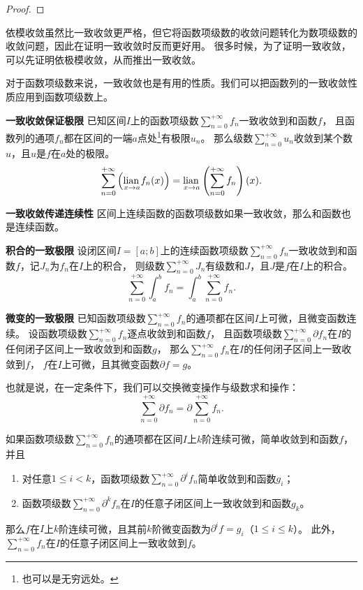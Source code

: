 \documentclass[12pt,UTF8]{ctexbook}
\begin{document}
\begin{appendix}
\begin{proof}
\end{proof}

依模收敛虽然比一致收敛更严格，但它将函数项级数的收敛问题转化为数项级数的收敛问题，因此在证明一致收敛时反而更好用。
很多时候，为了证明一致收敛，可以先证明依极模收敛，从而推出一致收敛。

对于函数项级数来说，一致收敛也是有用的性质。我们可以把函数列的一致收敛性质应用到函数项级数上。

\begin{tm}{\textbf{一致收敛保证极限}}
    已知区间$I$上的函数项级数$\sum_{n=0}^{+\infty} f_n$一致收敛到和函数$f$，
    且函数列的通项$f_n$都在区间的一端$a$点处\footnote{也可以是无穷远处。}有极限$u_n$。
    那么级数$\sum_{n=0}^{+\infty} u_n$收敛到某个数$u$，且$u$是$f$在$a$处的极限。
    $$ \sum_{n=0}^{+\infty} \left(\underset{x\to a}{\operatorname{lian}\,} f_n(x) \right) = \underset{x\to a}{\operatorname{lian}\,} \left(\sum_{n=0}^{+\infty} f_n\right)(x). $$
\end{tm}

\begin{tm}{\textbf{一致收敛传递连续性}}
    区间上连续函数的函数项级数如果一致收敛，那么和函数也是连续函数。
\end{tm}

\begin{tm}{\textbf{积合的一致极限}}
    设闭区间$I=[a;b]$上的连续函数项级数$\sum_{n=0}^{+\infty} f_n$一致收敛到和函数$f$，记$J_n$为$f_n$在$I$上的积合，
    则级数$\sum_{n=0}^{+\infty} J_n$有级数和$J$，且$J$是$f$在$I$上的积合。
    $$ \sum_{n=0}^{+\infty} \int_a^b f_n = \int_a^b \sum_{n=0}^{+\infty} f_n. $$
\end{tm}

\begin{tm}{\textbf{微变的一致极限}}
    已知函数项级数$\sum_{n=0}^{+\infty} f_n$的通项都在区间$I$上可微，且微变函数连续。
    设函数项级数$\sum_{n=0}^{+\infty} f_n$逐点收敛到和函数$f$，
    且函数项级数$\sum_{n=0}^{+\infty} \partial f_n$在$I$的任何闭子区间上一致收敛到和函数$g$，
    那么$\sum_{n=0}^{+\infty} f_n$在$I$的任何闭子区间上一致收敛到$f$，
    $f$在$I$上可微，且其微变函数$\partial f = g$。

    也就是说，在一定条件下，我们可以交换微变操作与级数求和操作：
    $$ \sum_{n=0}^{+\infty} \partial f_n = \partial \sum_{n=0}^{+\infty} f_n. $$
    
    如果函数项级数$\sum_{n=0}^{+\infty} f_n$的通项都在区间$I$上$k$阶连续可微，简单收敛到和函数$f$，并且
    \begin{enumerate}
        \item 对任意$1 \leqslant i < k$，函数项级数$\sum_{n=0}^{+\infty} \partial^i f_n$简单收敛到和函数$g_i$；
        \item 函数项级数$\sum_{n=0}^{+\infty} \partial^k f_n$在$I$的任意子闭区间上一致收敛到和函数$g_k$。
    \end{enumerate}
    那么$f$在$I$上$k$阶连续可微，且其前$k$阶微变函数为$\partial^i f = g_i$（$1 \leqslant i\leqslant k$）。
    此外，$\sum_{n=0}^{+\infty} f_n$在$I$的任意子闭区间上一致收敛到$f$。
\end{tm}


\end{appendix}
\end{document}
